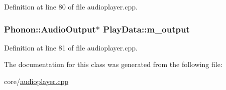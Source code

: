 Definition at line 80 of file audioplayer.\+cpp.

\hypertarget{classPlayData_a4184644cad89295edf1ec12a86f4d571}{
\subsubsection[{m\+\_\+output}]{\setlength{\rightskip}{0pt plus 5cm}Phonon\+::\+Audio\+Output$\ast$ Play\+Data\+::m\+\_\+output}}\label{classPlayData_a4184644cad89295edf1ec12a86f4d571}


Definition at line 81 of file audioplayer.\+cpp.



The documentation for this class was generated from the following file\+:\begin{DoxyCompactItemize}
\item 
core/\hyperlink{audioplayer_8cpp}{audioplayer.\+cpp}\end{DoxyCompactItemize}
